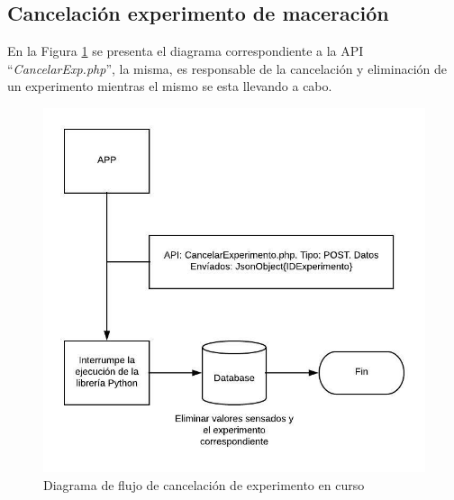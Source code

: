         \subsection{Cancelación experimento de maceración}
            \par En la Figura \ref{fig:ApiCancelExp} se presenta el diagrama correspondiente a la API ``\textit{CancelarExp.php}'', la misma, es responsable de la cancelación y eliminación de un experimento mientras el mismo se esta llevando a cabo.
            \begin{figure}[htb]
                \centering
                \includegraphics{DiagramaCancelExp.jpeg}
                \caption{Diagrama de flujo de cancelación de experimento en curso}
                \label{fig:ApiCancelExp}
            \end{figure}
        